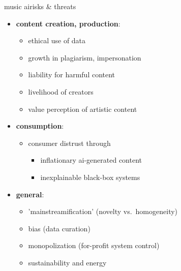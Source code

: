 \begin{frame}{music ai}{risks \& threats}
    
        \begin{itemize}
            \item \textbf{content creation, production}:
                \begin{itemize}
                    \item ethical use of data
                    \item growth in plagiarism, impersonation
                    \item liability for harmful content
                    \item livelihood of  creators
                    \item value perception of artistic content
                \end{itemize}
            \smallskip
            \item<2-> \textbf{consumption}:
                \begin{itemize}
                    \item consumer distrust through 
                        \begin{itemize}
                            \item inflationary ai-generated content
                            \item inexplainable black-box systems
                        \end{itemize}
                \end{itemize}
            \smallskip
            \item<3-> \textbf{general}:
                \begin{itemize}
                    \item 'mainstreamification' (novelty vs.\ homogeneity)
                    \item bias (data curation)
                    \item monopolization (for-profit system control)
                    \item sustainability and energy 
                \end{itemize}
        \end{itemize}
\end{frame}




